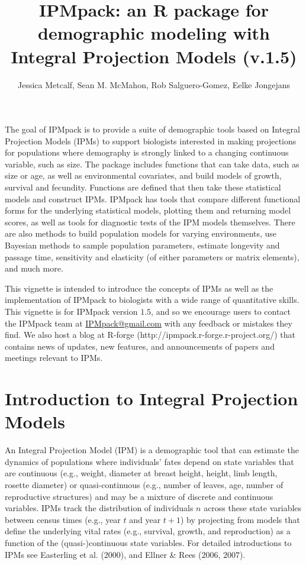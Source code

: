 \documentclass{article}
\begin{document}
\title{IPMpack: an R package for demographic modeling with Integral Projection
Models (v.1.5)}
\author{Jessica Metcalf, Sean M. McMahon, Rob Salguero-Gomez, Eelke Jongejans}
\maketitle


The goal of IPMpack is to provide a suite of demographic tools based
on Integral Projection Models (IPMs) to support biologists interested in
making projections for populations where demography is strongly linked to a changing continuous variable, such as size. The package includes functions that can take data, such as size or age, as well as environmental covariates, and build models of growth, survival and fecundity. Functions are defined that then take these
statistical models and construct IPMs. IPMpack has tools that compare different
functional forms for the underlying statistical models, plotting them and
returning model scores, as well as tools for diagnostic tests of the IPM models
themselves. There are also methods to build population models for varying environments, use Bayesian methods to sample population parameters,  estimate longevity and passage time, sensitivity and elasticity (of either parameters or matrix elements), and much more.

This vignette is intended to introduce the concepts of IPMs as well as the
implementation of IPMpack to biologists with a wide range of quantitative skills.  This vignette is for IPMpack version $1.5$, and so we encourage users to contact the IPMpack team at \href{IPMpack@gmail.com}{IPMpack@gmail.com} with any feedback or mistakes they find.  We also host a blog at R-forge (http://ipmpack.r-forge.r-project.org/) that contains news of updates, new features, and announcements of papers and meetings relevant to IPMs.
 
\newpage

\section{Introduction to Integral Projection Models}
An Integral Projection Model (IPM) is a demographic tool that can estimate the
dynamics of populations where individuals' fates depend on state variables that
are continuous (e.g., weight, diameter at breast height, height, limb length,
rosette diameter) or quasi-continuous (e.g., number of leaves, age, number of
reproductive structures) and may be a mixture of discrete and continuous
variables. IPMs track the distribution of individuals $n$ across these state
variables between census times (e.g., year $t$ and year $t+1$) by projecting from models that define the underlying vital rates (e.g., survival, growth, and reproduction) as a function of the (quasi-)continuous state variables. For detailed introductions to IPMs see Easterling et al. ($2000$), and Ellner \& Rees ($2006$, $2007$).
\end{document}
